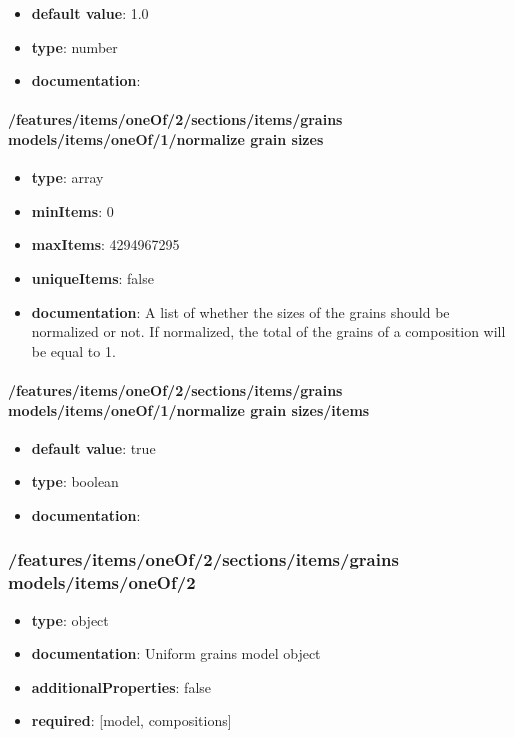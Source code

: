 \begin{itemize}\item {\bf default value}: 1.0
\item {\bf type}: number
\item {\bf documentation}: 
\end{itemize}\paragraph{/features/items/oneOf/2/sections/items/grains models/items/oneOf/1/normalize grain sizes}
\begin{itemize}\item {\bf type}: array
\item {\bf minItems}: 0
\item {\bf maxItems}: 4294967295
\item {\bf uniqueItems}: false
\item {\bf documentation}: A list of whether the sizes of the grains should be normalized or not. If normalized, the total of the grains of a composition will be equal to 1.
\end{itemize}\paragraph{/features/items/oneOf/2/sections/items/grains models/items/oneOf/1/normalize grain sizes/items}
\begin{itemize}\item {\bf default value}: true
\item {\bf type}: boolean
\item {\bf documentation}: 
\end{itemize}\subsubsection{/features/items/oneOf/2/sections/items/grains models/items/oneOf/2}
\begin{itemize}\item {\bf type}: object
\item {\bf documentation}: Uniform grains model object
\item {\bf additionalProperties}: false
\item {\bf required}: [model, compositions]\end{itemize}
